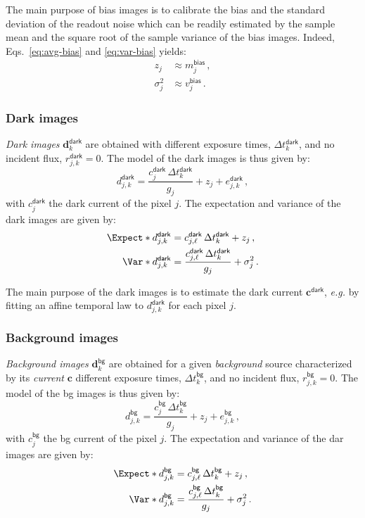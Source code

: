 \documentclass[a4paper,11pt,twoside]{scrartcl}
\newcommand*{\eg}{\emph{e.g.}\xspace}
\newcommand*{\Tag}[1]{\mathsf{#1}}
\newcommand*{\V}[1]{\boldsymbol{#1}}   %
\theoremstyle{plain} %
\theoremstyle{definition}
\theoremstyle{remark}
\begin{document}
The main purpose of bias images is to calibrate the bias and the standard
deviation of the readout noise which can be readily estimated by the sample
mean and the square root of the sample variance of the bias images.  Indeed,
Eqs.~\eqref{eq:avg-bias} and \eqref{eq:var-bias} yields:
\begin{align}
  z_j &\approx m_j^\Tag{bias} \,, \\
  \sigma_j^2 &\approx v_j^\Tag{bias} \,.
\end{align}


\subsubsection{Dark images}

\emph{Dark images} $\V d_{k}^\Tag{dark}$ are obtained with different exposure
times, $\Delta t_k^\Tag{dark}$, and no incident flux, $r_{j,k}^\Tag{dark} = 0$.
The model of the dark images is thus given by:
\begin{equation}
  d_{j,k}^\Tag{dark} =
  \frac{c^\Tag{dark}_j\,\Delta t_k^\Tag{dark}}{g_j}
   + z_j + e_{j,k}^\Tag{dark} \, ,
  \label{eq:dark-model}
\end{equation}
with $c^\Tag{dark}_j$ the dark current of the pixel $j$.  The expectation and
variance of the dark images are given by:
\begin{align}
  \Expect*{d_{j,k}^\Tag{dark}}
  &= c_{j,\ell}^\Tag{dark}\,\Delta t_k^\Tag{dark} + z_j \, ,\\
  \Var*{d_{j,k}^\Tag{dark}}
  &= \frac{c_{j,\ell}^\Tag{dark}\,\Delta t_k^\Tag{dark}}{g_j} + \sigma_j^2 \, .
\end{align}

The main purpose of the dark images is to estimate the dark current $\V
c^\Tag{dark}$, \eg by fitting an affine temporal law to $d_{j,k}^\Tag{dark}$
for each pixel $j$.


\subsubsection{Background images}

\emph{Background images} $\V d_{k}^\Tag{bg}$ are obtained for a given
\emph{background} source characterized by its \emph{current} $\V c$ different
exposure
times, $\Delta t_k^\Tag{bg}$, and no incident flux, $r_{j,k}^\Tag{bg} = 0$.
The model of the bg images is thus given by:
\begin{equation}
  d_{j,k}^\Tag{bg} =
  \frac{c^\Tag{bg}_j\,\Delta t_k^\Tag{bg}}{g_j}
   + z_j + e_{j,k}^\Tag{bg} \, ,
  \label{eq:bg-model}
\end{equation}
with $c^\Tag{bg}_j$ the bg current of the pixel $j$.  The expectation and
variance of the dar images are given by:
\begin{align}
  \Expect*{d_{j,k}^\Tag{bg}}
  &= c_{j,\ell}^\Tag{bg}\,\Delta t_k^\Tag{bg} + z_j \, ,\\
  \Var*{d_{j,k}^\Tag{bg}}
  &= \frac{c_{j,\ell}^\Tag{bg}\,\Delta t_k^\Tag{bg}}{g_j} + \sigma_j^2 \, .
\end{align}
\end{document}

